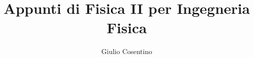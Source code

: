 \documentclass[italian,12pt,toc=sections]{HKNdocument}
\begin{document}
\title{Appunti di Fisica II per Ingegneria Fisica}
\author{Giulio Cosentino}



\frontmatter
\maketitle
\cclicense
\tableofcontents
\clearpage

\mainmatter
















\backmatter


\end{document}
